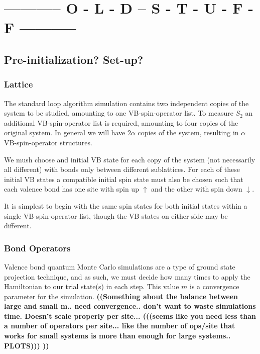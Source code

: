 \documentclass[prb,aps,twocolumn,floatfix,amsmath,amssymb,superscriptaddress,tightenlines]{revtex4}
\begin{document}
\section{----------- O - L - D -- S - T - U - F - F -----------}
\subsection{Pre-initialization? Set-up? }
 
\subsubsection{Lattice}
	
The standard loop algorithm simulation contains two independent copies of the system to be studied, amounting to one VB-spin-operator list. 
To measure $S_2$ an additional VB-spin-operator list is required, amounting to four copies of the original system.
In general we will have $2\alpha$ copies of the system, resulting in $\alpha$ VB-spin-operator structures.
	
We mush choose and initial VB state for each copy of the system (not necessarily all different) with bonds only between different sublattices. 
For each of these initial VB states a compatible initial spin state must also be chosen such that each valence bond has one site with spin up $\uparrow$ and the other with spin down $\downarrow$.

It is simplest to begin with the same spin states for both initial states within a single VB-spin-operator list, though the VB states on either side may be different.	
	
	
\subsubsection{Bond Operators}

Valence bond quantum Monte Carlo simulations are a type of ground state projection technique, and as such, we must decide how many times to apply the Hamiltonian to our trial state(s) in each step.  
This value $m$ is a convergence parameter for the simulation.
{\bf ((Something about the balance between large and small m.. need convergence.. don't want to waste simulations time.  Doesn't scale properly per site...   (((seems like you need less than a number of operators per site... like the number of ops/site that works for small systems is more than enough for large systems.. PLOTS)))   )) }
\end{document}
